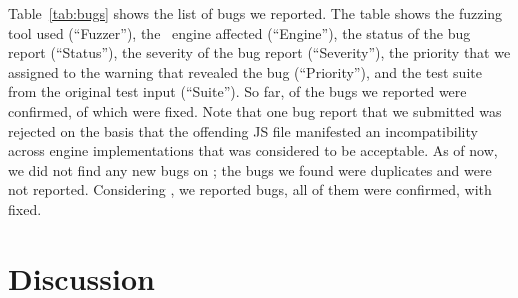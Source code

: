 \documentclass[sigconf,review, anonymous]{acmart}
\begin{document}
Table~\ref{tab:bugs} shows the list of bugs we reported. The table
shows the fuzzing tool used
(``Fuzzer''), the \js\ engine affected (``Engine''), the status of the
bug report (``Status''), the severity of the bug report (``Severity''), the priority
that we assigned to the warning that revealed the bug (``Priority''),
and the test suite from the original test input (``Suite''). So far,
\noDiffConfirmed{} of the bugs we reported were confirmed, \noDiffFixed{} of which
were fixed. Note that one bug report that we submitted was rejected on
the basis that the offending JS file manifested an incompatibility
across engine implementations that was considered to be acceptable. As
of now, we did not find any new bugs on \smonkey{}; the bugs we found
were duplicates and were not reported. Considering \veight{}, 
we reported \noDiffVeight{} bugs, 
all of them were confirmed, with \noDiffVeightFixed{} fixed.





\begin{center}
\end{center}


\section{Discussion}
\label{sec:bugs}
\end{document}
